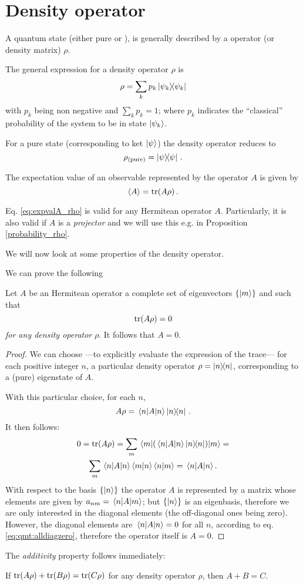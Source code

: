 \section{Density operator}\label{app:density}

A quantum state (either pure or ),
is generally described by a  operator (or density matrix) $\rho$.

The general expression for a density operator $\rho$ is
$$
  \rho = \sum_{k}p_{k}\ketbra{\psi_{k}}
$$
with $p_{k}$ being non negative and $\sum_{k}p_{k} = 1$;
where $p_k$ indicates the ``classical'' probability of the system to be in state $\ket{\psi_{k}}$.

For a pure state (corresponding to ket $\ket{\psi}$) the density operator reduces to
\[
  \rho_{(\text{pure})} = \ketbra{\psi}\,\text{.}
\]

The expectation value of an observable represented by the operator $A$
is given by \parencite{FanoDensity}
\begin{equation}\label{eq:expvalA_rho}
  \expval{A} = \tr(A\rho)\,.
\end{equation}

Eq. \eqref{eq:expvalA_rho} is valid for any Hermitean operator $A$. Particularly,
it is also valid if $A$ is a \emph{projector} and we will use this
e.g. in Proposition \ref{probability_rho}.

We will now look at some properties of the density operator.

We can prove the following
\begin{proposition}
  Let $A$ be an Hermitean operator
  a complete set of eigenvectors $\{\ket{m}\}$
  and
  such that
  $$
    \tr(A\rho) = 0 
  $$
  \emph{for any density operator} $\rho$.
  It follows that $A = 0$.

  \begin{proof}
    We can choose
    ---to explicitly evaluate the expression of the trace---
    for each positive integer $n$,
    a particular density operator $\rho = \ketbra{n}$,
    corresponding to a (pure) eigenstate of $A$.

    With this particular choice,
    for each $n$,
    $$
      A\rho = \mel{n}{A}{n}\ketbra{n}\,.
    $$
    It then follows:
    \begin{multline}\label{eq:qmt:alldiagzero}
      0 = \tr(A\rho) = \sum_{m}\mel{m}{ ( \mel{n}{A}{n}\ketbra{n} ) }{m} = \\
          \sum_{m} \mel{n}{A}{n} \braket{m}{n} \braket{n}{m}
        = \mel{n}{A}{n} .
    \end{multline}
    With respect to the basis $\left\{\ket{n}\right\}$ the operator $A$ is
    represented by a matrix whose elements are given by $a_{nm} = \mel{n}{A}{m}$;
    but $\left\{\ket{n}\right\}$ is an eigenbasis, therefore we are only interested in the diagonal
    elements (the off-diagonal ones being zero).
    However, the diagonal elements are  $\mel{n}{A}{n} = 0$
    for all $n$, according to eq. \eqref{eq:qmt:alldiagzero}, therefore the operator itself is $A=0$.
  \end{proof}
\end{proposition}

The \emph{additivity} property follows immediately:

\begin{corollary}
If $\tr(A\rho) + \tr(B\rho) = \tr(C\rho)$ for any density operator $\rho$,
then $A + B = C$.
\end{corollary}
